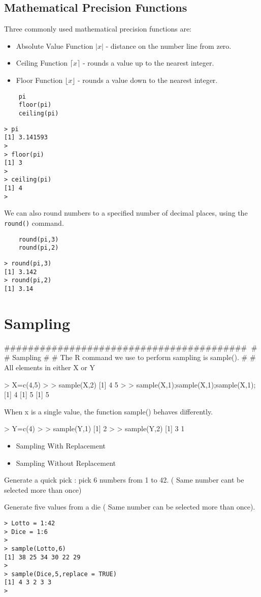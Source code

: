 \documentclass[a4paper,12pt]{article}
\begin{document}
\subsection{Mathematical Precision Functions}
Three commonly used mathematical precision functions are:
\begin{itemize}
	\item Absolute Value Function $| x |$ - distance on the number line from zero.
	\item Ceiling Function $\lceil x \rceil$ - rounds a value up to the nearest integer.
	\item Floor Function  $\lfloor x \rfloor $ - rounds a value down to the nearest integer.
\end{itemize}
\begin{framed}
	\begin{verbatim}
	pi
	floor(pi)
	ceiling(pi)
	\end{verbatim}
\end{framed}
\begin{verbatim}
> pi
[1] 3.141593
>
> floor(pi)
[1] 3
>
> ceiling(pi)
[1] 4
>
\end{verbatim}
We can also round numbers to a specified number of decimal places, using the \texttt{round()} command.
\begin{framed}
	\begin{verbatim}
	round(pi,3)
	round(pi,2)
	\end{verbatim}
\end{framed}
\begin{verbatim}
> round(pi,3)
[1] 3.142
> round(pi,2)
[1] 3.14
\end{verbatim}

\section{Sampling}
#########################################
# 
# Sampling
# 
# The R command we use to perform sampling is sample().
# 
# All elements in either X or Y




> X=c(4,5)
>
> sample(X,2)
[1] 4 5
>
> sample(X,1);sample(X,1);sample(X,1);
[1] 4
[1] 5
[1] 5

When x is a single value, the function sample() behaves differently.

> Y=c(4)
>
> sample(Y,1)
[1] 2
> 
> sample(Y,2)
[1] 3 1


\begin{itemize}
	\item Sampling With Replacement
	\item Sampling Without Replacement
\end{itemize}
Generate a quick pick : pick 6 numbers from 1 to 42. ( Same number cant be selected more than once)

Generate five values from a die ( Same number can be selected more than once).

\begin{verbatim}
> Lotto = 1:42
> Dice = 1:6
> 
> sample(Lotto,6)
[1] 38 25 34 30 22 29
> 
> sample(Dice,5,replace = TRUE)
[1] 4 3 2 3 3
>
\end{verbatim}
\end{document}
